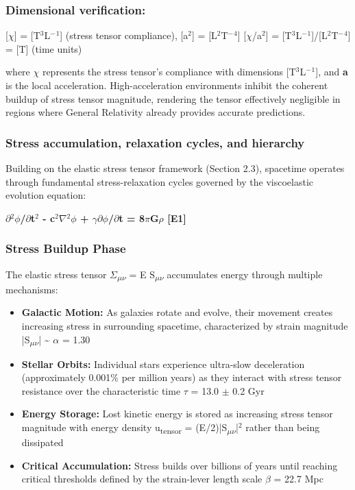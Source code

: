 \documentclass[11pt,a4paper]{article}
\begin{document}
\begin{mdframed}[linecolor=accent,linewidth=0.5pt,backgroundcolor=callout-bg,leftline=true,rightline=true,topline=true,bottomline=true,innerleftmargin=8pt,innerrightmargin=8pt,innertopmargin=6pt,innerbottommargin=6pt]
\subsubsection{Dimensional verification:}
[$\chi$] = [T$^{3}$L$^{-}$$^{1}$] (stress tensor compliance), [a$^{2}$] = [L$^{2}$T$^{-}$$^{4}$]\newline{}
[$\chi$/a$^{2}$] = [T$^{3}$L$^{-}$$^{1}$]/[L$^{2}$T$^{-}$$^{4}$] = [T] \checkmark{} (time units)
\end{mdframed}

where \textbf{$\chi$} represents the stress tensor's compliance with dimensions [T$^{3}$L$^{-}$$^{1}$], and \textbf{a} is the local acceleration. High-acceleration environments inhibit the coherent buildup of stress tensor magnitude, rendering the tensor effectively negligible in regions where General Relativity already provides accurate predictions.

\subsubsection{Stress accumulation, relaxation cycles, and hierarchy}
Building on the elastic stress tensor framework (Section 2.3), spacetime operates through fundamental stress-relaxation cycles governed by the viscoelastic evolution equation:

\textbf{$\partial$$^{2}$$\phi$/$\partial$t$^{2}$ - c$^{2}$$\nabla$$^{2}$$\phi$ + $\gamma$$\partial$$\phi$/$\partial$t = 8$\pi$G$\rho$ [E1]}

\subsubsection{Stress Buildup Phase}
The elastic stress tensor $\Sigma$\textsubscript{$\mu$$\nu$} = E S\textsubscript{$\mu$$\nu$} accumulates energy through multiple mechanisms:

\begin{itemize}
  \item \textbf{Galactic Motion:} As galaxies rotate and evolve, their movement creates increasing stress in surrounding spacetime, characterized by strain magnitude |S\textsubscript{$\mu$$\nu$}| \~{} $\alpha$ = 1.30
  \item \textbf{Stellar Orbits:} Individual stars experience ultra-slow deceleration (approximately 0.001\% per million years) as they interact with stress tensor resistance over the characteristic time $\tau$ = 13.0 $\pm$ 0.2 Gyr
  \item \textbf{Energy Storage:} Lost kinetic energy is stored as increasing stress tensor magnitude with energy density u\textsubscript{tensor} = (E/\allowbreak{}2)|S\textsubscript{$\mu$$\nu$}|$^{2}$ rather than being dissipated
  \item \textbf{Critical Accumulation:} Stress builds over billions of years until reaching critical thresholds defined by the strain-lever length scale $\beta$ = 22.7 Mpc
\end{itemize}
\end{document}
